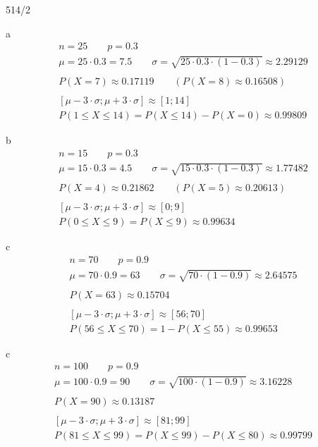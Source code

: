 \begin{exercise}{514/2}
  \item [a]
  \begin{gather*}
    n = 25 \qquad p = 0.3 \\
    \mu = 25 \cdot 0.3 = 7.5 \qquad \sigma = \sqrt{25 \cdot 0.3 \cdot (1 - 0.3)} \approx 2.29129 \\\\
    P(X = 7) \approx 0.17119 \qquad (P(X = 8) \approx 0.16508) \\\\
    [\mu - 3 \cdot \sigma; \mu + 3 \cdot \sigma] \approx [1; 14] \\
    P(1 \leq X \leq 14) = P(X \leq 14) - P(X = 0) \approx 0.99809
  \end{gather*}
  \item [b]
  \begin{gather*}
    n = 15 \qquad p = 0.3 \\
    \mu = 15 \cdot 0.3 = 4.5 \qquad \sigma = \sqrt{15 \cdot 0.3 \cdot (1 - 0.3)} \approx 1.77482 \\\\
    P(X = 4) \approx 0.21862 \qquad (P(X = 5) \approx 0.20613) \\\\
    [\mu - 3 \cdot \sigma; \mu + 3 \cdot \sigma] \approx [0; 9] \\
    P(0 \leq X \leq 9) = P(X \leq 9) \approx 0.99634
  \end{gather*}
  \item [c]
  \begin{gather*}
    n = 70 \qquad p = 0.9 \\
    \mu = 70 \cdot 0.9 = 63 \qquad \sigma = \sqrt{70 \cdot (1 - 0.9)} \approx 2.64575 \\\\
    P(X = 63) \approx 0.15704 \\\\
    [\mu - 3 \cdot \sigma; \mu + 3 \cdot \sigma] \approx [56; 70] \\
    P(56 \leq X \leq 70) = 1 - P(X \leq 55) \approx 0.99653
  \end{gather*}
  \item [c]
  \begin{gather*}
    n = 100 \qquad p = 0.9 \\
    \mu = 100 \cdot 0.9 = 90 \qquad \sigma = \sqrt{100 \cdot (1 - 0.9)} \approx 3.16228 \\\\
    P(X = 90) \approx 0.13187 \\\\
    [\mu - 3 \cdot \sigma; \mu + 3 \cdot \sigma] \approx [81; 99] \\
    P(81 \leq X \leq 99) = P(X \leq 99) - P(X \leq 80) \approx 0.99799
  \end{gather*}
\end{exercise}

